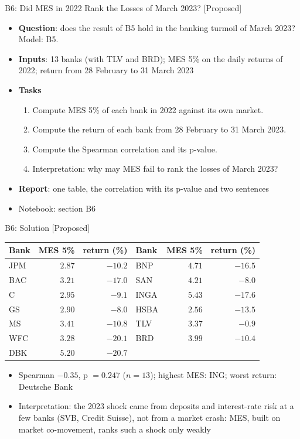 \begin{frame}{B6: Did MES in 2022 Rank the Losses of March 2023? [Proposed]}
\itemsize{\footnotesize}
\begin{itemize}
\item \textbf{Question}: does the result of B5 hold in the banking turmoil of March 2023? Model: B5.
\item \textbf{Inputs}: 13 banks (with TLV and BRD); MES 5\% on the daily returns of 2022; return from 28 February to 31 March 2023
\item \textbf{Tasks}
\begin{enumerate}
    \item Compute MES 5\% of each bank in 2022 against its own market.
    \item Compute the return of each bank from 28 February to 31 March 2023.
    \item Compute the Spearman correlation and its p-value.
    \item Interpretation: why may MES fail to rank the losses of March 2023?
\end{enumerate}
\item \textbf{Report}: one table, the correlation with its p-value and two sentences
\item Notebook: section B6
\end{itemize}
\end{frame}

\ifsolutions
\begin{frame}{B6: Solution [Proposed]}
\itemsize{\footnotesize}
\begin{center}
\scriptsize
\begin{tabular}{lrr|lrr}
\toprule
Bank & MES 5\% & return (\%) & Bank & MES 5\% & return (\%) \\
\midrule
JPM & $2.87$ & $-10.2$ & BNP & $4.71$ & $-16.5$ \\
BAC & $3.21$ & $-17.0$ & SAN & $4.21$ & $-8.0$ \\
C & $2.95$ & $-9.1$ & INGA & $5.43$ & $-17.6$ \\
GS & $2.90$ & $-8.0$ & HSBA & $2.56$ & $-13.5$ \\
MS & $3.41$ & $-10.8$ & TLV & $3.37$ & $-0.9$ \\
WFC & $3.28$ & $-20.1$ & BRD & $3.99$ & $-10.4$ \\
DBK & $5.20$ & $-20.7$ & & & \\
\bottomrule
\end{tabular}
\end{center}
\begin{itemize}
    \item Spearman $-0.35$, p $= 0.247$ ($n = 13$); highest MES: ING; worst return: Deutsche Bank
    \item Interpretation: the 2023 shock came from deposits and interest-rate risk at a few banks (SVB, Credit Suisse), not from a market crash: MES, built on market co-movement, ranks such a shock only weakly
\end{itemize}
\end{frame}
\fi


